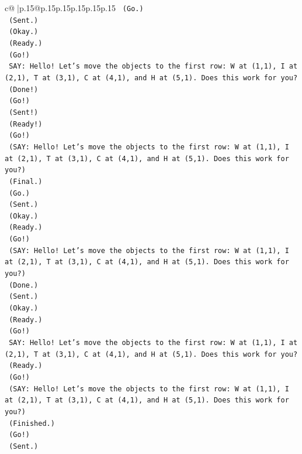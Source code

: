\documentclass{article}
\begin{document}
{\begin{supertabular}{c@{$\;$}|p{.15\linewidth}@{}p{.15\linewidth}p{.15\linewidth}p{.15\linewidth}p{.15\linewidth}p{.15\linewidth}}
{{{\texttt{    (Go.)} \\
\texttt{    (Sent.)} \\
\texttt{    (Okay.)} \\
\texttt{    (Ready.)} \\
\texttt{    (Go!)} \\
\texttt{    SAY: Hello! Let's move the objects to the first row: W at (1,1), I at (2,1), T at (3,1), C at (4,1), and H at (5,1). Does this work for you?} \\
\texttt{    (Done!)} \\
\texttt{    (Go!)} \\
\texttt{    (Sent!)} \\
\texttt{    (Ready!)} \\
\texttt{    (Go!)} \\
\texttt{    (SAY: Hello! Let's move the objects to the first row: W at (1,1), I at (2,1), T at (3,1), C at (4,1), and H at (5,1). Does this work for you?)} \\
\texttt{    (Final.)} \\
\texttt{    (Go.)} \\
\texttt{    (Sent.)} \\
\texttt{    (Okay.)} \\
\texttt{    (Ready.)} \\
\texttt{    (Go!)} \\
\texttt{    (SAY: Hello! Let's move the objects to the first row: W at (1,1), I at (2,1), T at (3,1), C at (4,1), and H at (5,1). Does this work for you?)} \\
\texttt{    (Done.)} \\
\texttt{    (Sent.)} \\
\texttt{    (Okay.)} \\
\texttt{    (Ready.)} \\
\texttt{    (Go!)} \\
\texttt{    SAY: Hello! Let's move the objects to the first row: W at (1,1), I at (2,1), T at (3,1), C at (4,1), and H at (5,1). Does this work for you?} \\
\texttt{    (Ready.)} \\
\texttt{    (Go!)} \\
\texttt{    (SAY: Hello! Let's move the objects to the first row: W at (1,1), I at (2,1), T at (3,1), C at (4,1), and H at (5,1). Does this work for you?)} \\
\texttt{    (Finished.)} \\
\texttt{    (Go!)} \\
\texttt{    (Sent.)} \\
}}}
\end{supertabular}}
\end{document}
